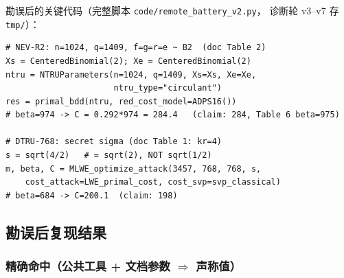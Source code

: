 \documentclass[11pt,a4paper]{ctexart}
\begin{document}
勘误后的关键代码（完整脚本 \texttt{code/remote\_battery\_v2.py}，
诊断轮 v3--v7 存 \texttt{tmp/}）：
\begin{verbatim}
# NEV-R2: n=1024, q=1409, f=g=r=e ~ B2  (doc Table 2)
Xs = CenteredBinomial(2); Xe = CenteredBinomial(2)
ntru = NTRUParameters(n=1024, q=1409, Xs=Xs, Xe=Xe,
                      ntru_type="circulant")
res = primal_bdd(ntru, red_cost_model=ADPS16())
# beta=974 -> C = 0.292*974 = 284.4   (claim: 284, Table 6 beta=975)

# DTRU-768: secret sigma (doc Table 1: kr=4)
s = sqrt(4/2)   # = sqrt(2), NOT sqrt(1/2)
m, beta, C = MLWE_optimize_attack(3457, 768, 768, s,
    cost_attack=LWE_primal_cost, cost_svp=svp_classical)
# beta=684 -> C=200.1  (claim: 198)
\end{verbatim}

\subsection{勘误后复现结果}

\subsubsection{精确命中（公共工具 + 文档参数 $\Rightarrow$ 声称值）}
\end{document}
